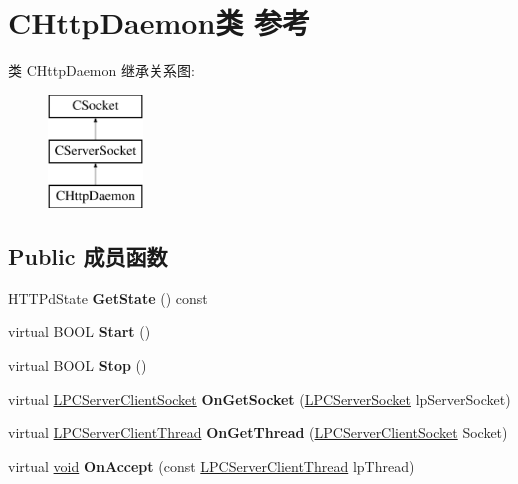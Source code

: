 \hypertarget{class_c_http_daemon}{}\section{C\+Http\+Daemon类 参考}
\label{class_c_http_daemon}
类 C\+Http\+Daemon 继承关系图\+:\begin{figure}[H]
\begin{center}
\leavevmode
\includegraphics[height=3.000000cm]{class_c_http_daemon}
\end{center}
\end{figure}
\subsection*{Public 成员函数}
\begin{DoxyCompactItemize}
\item 
\mbox{\label{class_c_http_daemon_ada18a0195d547587e284763046489d5a}} 
H\+T\+T\+Pd\+State {\bfseries Get\+State} () const
\item 
\mbox{\label{class_c_http_daemon_a3090ddab0c66e595d090071c48270c31}} 
virtual B\+O\+OL {\bfseries Start} ()
\item 
\mbox{\label{class_c_http_daemon_a0ba2c2ca9da7113918f7725ff76f077a}} 
virtual B\+O\+OL {\bfseries Stop} ()
\item 
\mbox{\label{class_c_http_daemon_a9560c413c6f5257f82169f351e360e13}} 
virtual \hyperlink{class_c_server_client_socket}{L\+P\+C\+Server\+Client\+Socket} {\bfseries On\+Get\+Socket} (\hyperlink{class_c_server_socket}{L\+P\+C\+Server\+Socket} lp\+Server\+Socket)
\item 
\mbox{\label{class_c_http_daemon_abda9d8d2ae892f75562cad8e48a9405e}} 
virtual \hyperlink{class_c_server_client_thread}{L\+P\+C\+Server\+Client\+Thread} {\bfseries On\+Get\+Thread} (\hyperlink{class_c_server_client_socket}{L\+P\+C\+Server\+Client\+Socket} Socket)
\item 
\mbox{\label{class_c_http_daemon_a049352bf2f13046f83430efbac40f4f1}} 
virtual \hyperlink{interfacevoid}{void} {\bfseries On\+Accept} (const \hyperlink{class_c_server_client_thread}{L\+P\+C\+Server\+Client\+Thread} lp\+Thread)
\end{DoxyCompactItemize}
